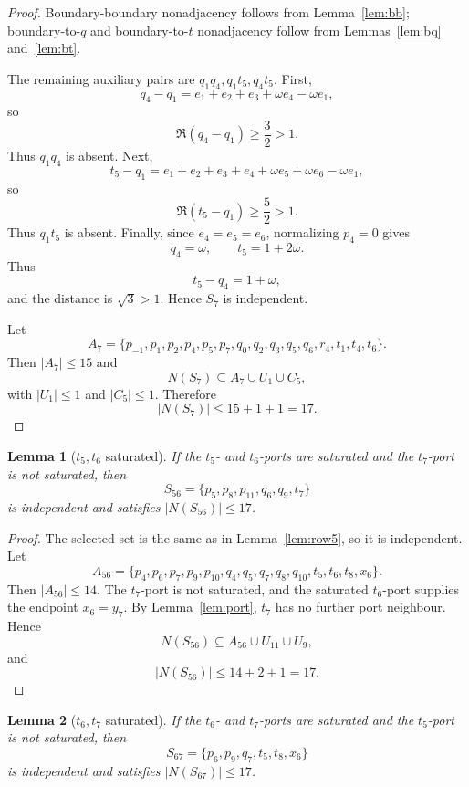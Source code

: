 \documentclass[11pt]{article}
\theoremstyle{plain}
\newtheorem{lemma}{Lemma}
\numberwithin{equation}{section}
\begin{document}
\begin{proof}
Boundary-boundary nonadjacency follows from Lemma~\ref{lem:bb}; boundary-to-$q$ and boundary-to-$t$ nonadjacency follow from Lemmas~\ref{lem:bq} and~\ref{lem:bt}.

The remaining auxiliary pairs are $q_1q_4,q_1t_5,q_4t_5$. First,
\[
 q_4-q_1=e_1+e_2+e_3+\omega e_4-\omega e_1,
\]
so
\[
 \Re(q_4-q_1)\ge\frac32>1.
\]
Thus $q_1q_4$ is absent. Next,
\[
 t_5-q_1=e_1+e_2+e_3+e_4+\omega e_5+\omega e_6-\omega e_1,
\]
so
\[
 \Re(t_5-q_1)\ge\frac52>1.
\]
Thus $q_1t_5$ is absent. Finally, since $e_4=e_5=e_6$, normalizing $p_4=0$ gives
\[
 q_4=\omega,
 \qquad
 t_5=1+2\omega.
\]
Thus
\[
 t_5-q_4=1+\omega,
\]
and the distance is $\sqrt3>1$. Hence $S_7$ is independent.

Let
\[
A_7=\{p_{-1},p_1,p_2,p_4,p_5,p_7,q_0,q_2,q_3,q_5,q_6,r_4,t_1,t_4,t_6\}.
\]
Then $|A_7|\le15$ and
\[
 N(S_7)\subseteq A_7\cup U_1\cup C_5,
\]
with $|U_1|\le1$ and $|C_5|\le1$. Therefore
\[
 |N(S_7)|\le15+1+1=17.
\]
\end{proof}

\begin{lemma}[$t_5,t_6$ saturated]\label{lem:row56}
If the $t_5$- and $t_6$-ports are saturated and the $t_7$-port is not saturated, then
\[
 S_{56}=\{p_5,p_8,p_{11},q_6,q_9,t_7\}
\]
is independent and satisfies $|N(S_{56})|\le17$.
\end{lemma}

\begin{proof}
The selected set is the same as in Lemma~\ref{lem:row5}, so it is independent. Let
\[
 A_{56}=\{p_4,p_6,p_7,p_9,p_{10},q_4,q_5,q_7,q_8,q_{10},t_5,t_6,t_8,x_6\}.
\]
Then $|A_{56}|\le14$. The $t_7$-port is not saturated, and the saturated $t_6$-port supplies the endpoint $x_6=y_7$. By Lemma~\ref{lem:port}, $t_7$ has no further port neighbour. Hence
\[
 N(S_{56})\subseteq A_{56}\cup U_{11}\cup U_9,
\]
and
\[
 |N(S_{56})|\le14+2+1=17.
\]
\end{proof}

\begin{lemma}[$t_6,t_7$ saturated]\label{lem:row67}
If the $t_6$- and $t_7$-ports are saturated and the $t_5$-port is not saturated, then
\[
 S_{67}=\{p_6,p_9,q_7,t_5,t_8,x_6\}
\]
is independent and satisfies $|N(S_{67})|\le17$.
\end{lemma}
\end{document}

